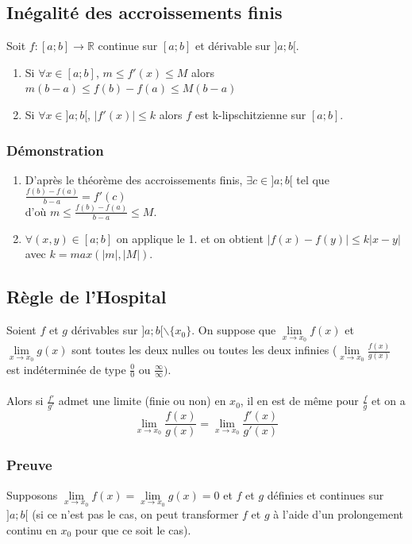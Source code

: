 \documentclass[a4paper,10pt]{book} %
\newcommand{\R}{\mathbb{R}}
\newcommand{\taf}{théorème des accroissements finis}
\begin{document}
\subsection{Inégalité des accroissements finis}
Soit $f : [a;b]\rightarrow \R$ continue sur $[a;b]$ et dérivable sur $]a;b[$.

\begin{enumerate}
\item Si $\forall x\in [a;b]$, $m\leq f'(x)\leq M$
alors $m(b-a)\leq f(b)-f(a)\leq M(b-a)$

\item Si $\forall x\in ]a;b[$, $|f'(x)|\leq k$
alors $f$ est k-lipschitzienne sur $[a;b]$.
\end{enumerate}

\subsubsection{Démonstration}
\begin{enumerate}
\item D'après le \taf{}, $\exists c\in ]a;b[$ tel que $\frac{f(b)-f(a)}{b-a}=f'(c)$\\
d'où $m\leq \frac{f(b)-f(a)}{b-a}\leq M$.

\item $\forall (x,y) \in [a;b]$ on applique le 1. et on obtient $|f(x)-f(y)|\leq k|x-y|$ avec $k=max(|m|,|M|)$.
\end{enumerate}

\subsection{Règle de l'Hospital}
Soient $f$ et $g$ dérivables sur $]a;b[\backslash\{x_0\}$. On suppose que $\lim\limits_{x\rightarrow x_0} f(x)$ et $\lim\limits_{x\rightarrow x_0}g(x)$ sont toutes les deux nulles ou toutes les deux infinies ($\lim\limits_{x\rightarrow x_0} \frac{f(x)}{g(x)}$ est indéterminée de type $\frac{0}{0}$ ou $\frac{\infty}{\infty})$.\\\\

Alors si $\frac{f'}{g'}$ admet une limite (finie ou non) en $x_0$, il en est de même pour $\frac{f}{g}$ et on a 
$$ \lim\limits_{x\rightarrow x_0}\frac{f(x)}{g(x)}=\lim\limits_{x\rightarrow x_0} \frac{f'(x)}{g'(x)} $$

\subsubsection{Preuve}
Supposons $\lim\limits_{x\rightarrow x_0} f(x)=\lim\limits_{x\rightarrow x_0}g(x)=0$ et $f$ et $g$ définies et continues sur $]a;b[$ (si ce n'est pas le cas, on peut transformer $f$ et $g$ à l'aide d'un prolongement continu en $x_0$ pour que ce soit le cas).\\
\end{document}
